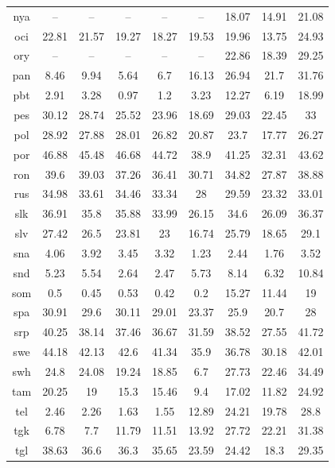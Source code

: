 \begin{table}[htb]
\begin{tabular}{@{}ccccccccc@{}}
        nya & -- & -- & -- & -- & -- & 18.07 & 14.91 & 21.08 \\
        oci & 22.81 & 21.57 & 19.27 & 18.27 & 19.53 & 19.96 & 13.75 & 24.93 \\
        ory & -- & -- & -- & -- & -- & 22.86 & 18.39 & 29.25 \\
        pan & 8.46 & 9.94 & 5.64 & 6.7 & 16.13 & 26.94 & 21.7 & 31.76 \\
        pbt & 2.91 & 3.28 & 0.97 & 1.2 & 3.23 & 12.27 & 6.19 & 18.99 \\
        pes & 30.12 & 28.74 & 25.52 & 23.96 & 18.69 & 29.03 & 22.45 & 33 \\
        pol & 28.92 & 27.88 & 28.01 & 26.82 & 20.87 & 23.7 & 17.77 & 26.27 \\
        por & 46.88 & 45.48 & 46.68 & 44.72 & 38.9 & 41.25 & 32.31 & 43.62 \\
        ron & 39.6 & 39.03 & 37.26 & 36.41 & 30.71 & 34.82 & 27.87 & 38.88 \\
        rus & 34.98 & 33.61 & 34.46 & 33.34 & 28 & 29.59 & 23.32 & 33.01 \\
        slk & 36.91 & 35.8 & 35.88 & 33.99 & 26.15 & 34.6 & 26.09 & 36.37 \\
        slv & 27.42 & 26.5 & 23.81 & 23 & 16.74 & 25.79 & 18.65 & 29.1 \\
        sna & 4.06 & 3.92 & 3.45 & 3.32 & 1.23 & 2.44 & 1.76 & 3.52 \\
        snd & 5.23 & 5.54 & 2.64 & 2.47 & 5.73 & 8.14 & 6.32 & 10.84 \\
        som & 0.5 & 0.45 & 0.53 & 0.42 & 0.2 & 15.27 & 11.44 & 19 \\
        spa & 30.91 & 29.6 & 30.11 & 29.01 & 23.37 & 25.9 & 20.7 & 28 \\
        srp & 40.25 & 38.14 & 37.46 & 36.67 & 31.59 & 38.52 & 27.55 & 41.72 \\
        swe & 44.18 & 42.13 & 42.6 & 41.34 & 35.9 & 36.78 & 30.18 & 42.01 \\
        swh & 24.8 & 24.08 & 19.24 & 18.85 & 6.7 & 27.73 & 22.46 & 34.49 \\
        tam & 20.25 & 19 & 15.3 & 15.46 & 9.4 & 17.02 & 11.82 & 24.92 \\
        tel & 2.46 & 2.26 & 1.63 & 1.55 & 12.89 & 24.21 & 19.78 & 28.8 \\
        tgk & 6.78 & 7.7 & 11.79 & 11.51 & 13.92 & 27.72 & 22.21 & 31.38 \\
        tgl & 38.63 & 36.6 & 36.3 & 35.65 & 23.59 & 24.42 & 18.3 & 29.35 \\

\end{tabular}
\end{table}
